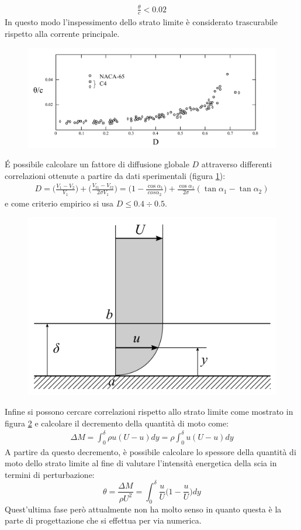 \begin{align*}
\frac{\theta}{c} < 0.02
\end{align*}
In questo modo l'inspessimento dello strato limite è considerato trascurabile rispetto alla corrente principale. 
\begin{figure}[h!]
\centering
  \includegraphics[width=\textwidth]{fig/CritCarico3.pdf}
\caption{}
\label{fig:CritCarico3}
\end{figure}

\'E possibile calcolare un fattore di diffusione globale $D$ attraverso differenti correlazioni ottenute a partire da dati sperimentali (figura \ref{fig:CritCarico3}):
\begin{align*}
D = \bigg( \frac{V_1 - V_2}{V_1} \bigg) + \bigg( \frac{V_{t1} - V_{t2}}{2 \sigma V_1} \bigg) = \bigg( 1 - \frac{\cos \alpha_1}{cos \alpha_2} \bigg) + \frac{\cos \alpha_1}{2 \sigma} (\tan \alpha_1 - \tan \alpha_2)
\end{align*}
e come criterio empirico si usa $ D \leqslant 0.4 \div 0.5  $.
\begin{figure}[h!]
\centering
  \includegraphics[width=.4\textwidth]{fig/CritCarico4.pdf}
\caption{}
\label{fig:CritCarico4}
\end{figure}

Infine si possono cercare correlazioni rispetto allo strato limite come mostrato in figura \ref{fig:CritCarico4} e calcolare il decremento della quantità di moto come:
\begin{align*}
\Delta M = \int_0^{\delta} \rho u (U-u) dy = \rho \int_0^{\delta} u (U-u) dy
\end{align*} 
A partire da questo decremento, è possibile calcolare lo spessore della quantità di moto dello strato limite al fine di valutare l'intensità energetica della scia in termini di perturbazione:
\begin{equation}
\theta = \frac{\Delta M}{\rho U^2} = \int_0^{\delta} \frac{u}{U} \bigg( 1 -\frac{u}{U} \bigg) dy
\end{equation}
Quest'ultima fase però attualmente non ha molto senso in quanto questa è la parte di progettazione che si effettua per via numerica.

